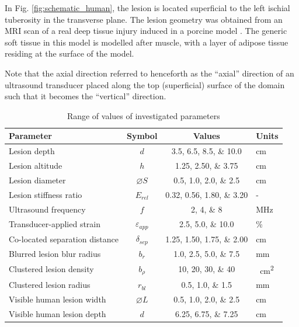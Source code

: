 		In Fig. \ref{fig:schematic_human}, the lesion is located superficial to the left ischial tuberosity in the transverse plane. The lesion geometry was obtained from an MRI scan of a real deep tissue injury induced in a porcine model \cite{solis13}. The generic soft tissue in this model is modelled after muscle, with a layer of adipose tissue residing at the surface of the model.

		Note that the axial direction referred to henceforth as the ``axial'' direction of an ultrasound transducer placed along the top (superficial) surface of the domain such that it becomes the ``vertical'' direction.

		\begin{table}[!htb]
			\centering
			\caption[Quasi-static model investigated parameters]{Range of values of investigated parameters}
			\label{tab:quasi-parametervalues}
			\begin{tabular}{lccs[table-unit-alignment = left]}
				\toprule
				Parameter & Symbol & Values & Units \\
				\midrule
				Lesion depth & $d$ & \numlist{3.5;6.5;8.5;10.0} & \si{\cm} \\
				Lesion altitude & $h$ & \numlist{1.25;2.50;3.75} & \si{\cm} \\
				Lesion diameter & $\diameter S$ & \numlist{0.5;1.0;2.0;2.5} & \si{\cm} \\
				Lesion stiffness ratio & $E_{rel}$ & \numlist{0.32;0.56;1.80;3.20} & - \\
				Ultrasound frequency & $f$ & \numlist{2;4;8} & \si{\MHz} \\
				Transducer-applied strain & $\varepsilon_{app}$ & \numlist{2.5;5.0;10.0} & \si{\percent} \\
				Co-located separation distance & $\delta_{sep}$ & \numlist{1.25;1.50;1.75;2.00} & \si{\cm} \\
				Blurred lesion blur radius & $b_r$ & \numlist{1.0;2.5;5.0;7.5} & \si{\mm} \\
				Clustered lesion density & $b_\rho$ & \numlist{10;20;30;40} & \si{\per\cm\squared} \\
				Clustered lesion radius & $r_{bl}$ & \numlist{0.5;1.0;1.5} & \si{\mm} \\
				Visible human lesion width & $\diameter L$ & \numlist{0.5;1.0;2.0;2.5} & \si{\cm} \\
				Visible human lesion depth & $d$ & \numlist{6.25;6.75;7.25} & \si{\cm} \\
				\bottomrule
			\end{tabular}
		\end{table}

